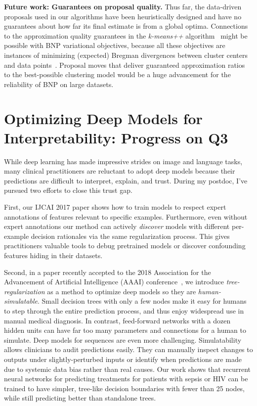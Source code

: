 \documentclass[11pt,letterpaper]{article}
\begin{document}
\textbf{Future work: Guarantees on proposal quality.}
Thus far, the data-driven proposals used in our algorithms have been heuristically designed and have no guarantees about how far its final estimate is from a global optima. Connections to the approximation quality guarantees in the \emph{k-means++} algorithm~\citep{arthur2007kmeansplusplus} might be possible with BNP variational objectives, because all these objectives are instances of minimizing (expected) Bregman divergences between cluster centers and data points~\citep{ackermann2010bregmanplusplus}. Proposal moves that deliver guaranteed approximation ratios to the best-possible clustering model would be a huge advancement for the reliability of BNP on large datasets.


\section*{Optimizing Deep Models for Interpretability: Progress on Q3}

While deep learning has made impressive strides on image and language tasks, many clinical practitioners are reluctant to adopt deep models because their predictions are difficult to interpret, explain, and trust.
During my postdoc, 
I've pursued two efforts to close this trust gap. 

First, our IJCAI 2017 paper \citep{ross2017rrr} shows how to train models to respect expert annotations of features relevant to specific examples. Furthermore, even without expert annotations our method can actively \emph{discover} models with different per-example decision rationales via the same regularization process. This gives practitioners valuable tools to debug pretrained models or discover confounding features hiding in their datasets.

Second, in a paper recently accepted to the 2018 Association for the Advancement of Artificial Intelligence (AAAI) conference~\citep{wu2017treeregularization}, we introduce \emph{tree-regularization} as a method to optimize deep models so they are \emph{human-simulatable}.
Small
decision trees with only a few nodes make it easy for
humans to step through the entire prediction process, and thus enjoy widespread use in manual medical diagnosis. In contrast,
feed-forward networks with a dozen hidden units can have far too many parameters and connections for a human to simulate. Deep models for sequences are even more
challenging.  
Simulatability allows clinicians to
audit predictions easily.  They can manually inspect changes to
outputs under slightly-perturbed inputs
or identify when predictions are made due to systemic data bias rather than real causes.
Our work shows that recurrent neural networks for predicting treatments for patients with sepsis or HIV can be trained to have simpler, tree-like decision boundaries with fewer than 25 nodes, while still predicting better than standalone trees.
\end{document}

